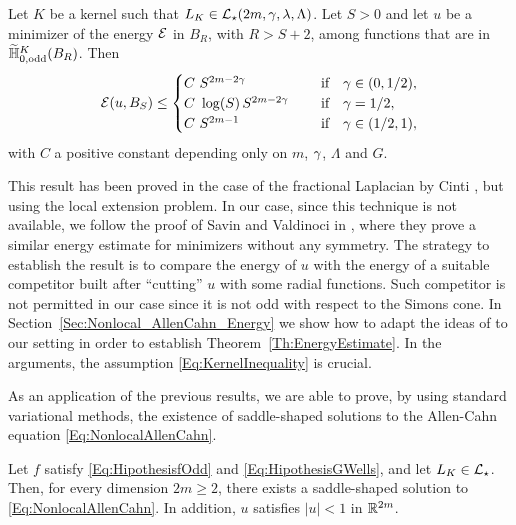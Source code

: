\begin{theorem}
	\label{Th:EnergyEstimate} 
	Let $K$ be a kernel such that $L_K\in \mathcal{L}_\star(2m, \gamma, \lambda, \Lambda)$. Let $S>0$ and let $u$ be a minimizer of the energy $\mathcal{E}$ in $B_{R}$, with $R>S+2$, among functions that are in $\widetilde{\mathbb{H}}^K_{0, \mathrm{odd}}(B_R)$. Then
	$$ \mathcal{E} (u,B_S) \leq \begin{cases}
	C \ S^{2m-2\gamma}\ \ \ \ &\textrm{if } \ \ \gamma\in(0,1/2),\\
	C\ \log(S)\,S^{2m-2\gamma}\ \ \ \ &\textrm{if } \ \ \gamma=1/2,\\
	C \ S^{2m-1}\ \ \ \ &\textrm{if } \ \ \gamma\in(1/2,1),\\
	\end{cases} $$
	with $C$ a positive constant depending only on $m$, $\gamma$, $\Lambda$ and $G$.
\end{theorem}



This result has been proved in the case of the fractional Laplacian by Cinti \cite{Cinti-Saddle,Cinti-Saddle2}, but using the local extension problem. In our case, since this technique is not available, we follow the proof of Savin and Valdinoci in \cite{SavinValdinoci-EnergyEstimate}, where they prove a similar energy estimate for minimizers without any symmetry. The strategy to establish the result is to compare the energy of $u$ with the energy of a suitable competitor built after ``cutting'' $u$ with some radial functions. Such competitor is not permitted in our case since it is not odd with respect to the Simons cone. In Section~\ref{Sec:Nonlocal_AllenCahn_Energy} we show how to adapt the ideas of \cite{SavinValdinoci-EnergyEstimate} to our setting in order to establish Theorem~\ref{Th:EnergyEstimate}. In the arguments, the assumption \eqref{Eq:KernelInequality} is crucial.



As an application of the previous results, we are able to prove, by using standard variational methods, the existence of saddle-shaped solutions to the Allen-Cahn equation \eqref{Eq:NonlocalAllenCahn}.

\begin{theorem}
	\label{Th:Existence}
    Let $f$ satisfy \eqref{Eq:HipothesisfOdd} and \eqref{Eq:HipothesisGWells}, and let $L_K\in \mathcal{L}_\star$. Then, for every dimension $2m \geq 2$, there exists a saddle-shaped solution to \eqref{Eq:NonlocalAllenCahn}. In addition, $u$ satisfies $|u|<1$ in $\mathbb{R}^{2m}$.
\end{theorem}

